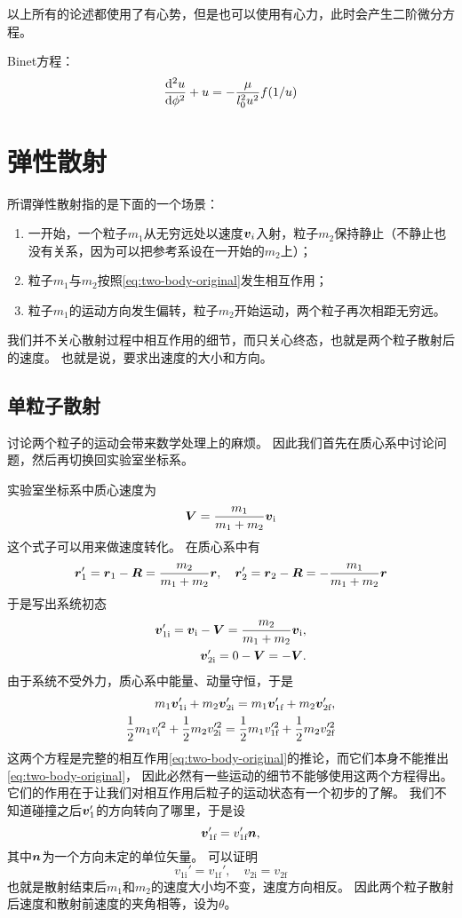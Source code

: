 \documentclass[UTF8, a4paper]{ctexart}
\begin{document}
以上所有的论述都使用了有心势，但是也可以使用有心力，此时会产生二阶微分方程。

Binet方程：
\begin{equation}
    \dv[2]{u}{\phi} + u = - \frac{\mu}{l_0^2 u^2} f(1/u)
\end{equation}

\section{弹性散射}

所谓弹性散射指的是下面的一个场景：
\begin{enumerate}
    \item 一开始，一个粒子$m_1$从无穷远处以速度$\vb*{v}_i$入射，粒子$m_2$保持静止（不静止也没有关系，因为可以把参考系设在一开始的$m_2$上）；
    \item 粒子$m_1$与$m_2$按照\eqref{eq:two-body-original}发生相互作用；
    \item 粒子$m_1$的运动方向发生偏转，粒子$m_2$开始运动，两个粒子再次相距无穷远。
\end{enumerate}
我们并不关心散射过程中相互作用的细节，而只关心终态，也就是两个粒子散射后的速度。
也就是说，要求出速度的大小和方向。

\subsection{单粒子散射}

讨论两个粒子的运动会带来数学处理上的麻烦。
因此我们首先在质心系中讨论问题，然后再切换回实验室坐标系。

实验室坐标系中质心速度为
\[
    \vb*{V} = \frac{m_1}{m_1 + m_2} \vb*{v}_\text{i}
\]
这个式子可以用来做速度转化。
在质心系中有
\[
    \vb*{r}_1' = \vb*{r}_1 - \vb*{R} = \frac{m_2}{m_1 + m_2} \vb*{r}, 
    \quad \vb*{r}_2' = \vb*{r}_2 - \vb*{R} = - \frac{m_1}{m_1 + m_2} \vb*{r}
\]
于是写出系统初态
\[
    \begin{split}
        \vb*{v}_{1\text{i}}' = \vb*{v}_\text{i} - \vb*{V} = \frac{m_2}{m_1 + m_2} \vb*{v}_\text{i}, \\
        \vb*{v}_{2\text{i}}' = 0 - \vb*{V} = - \vb*{V}.
    \end{split}
\]
由于系统不受外力，质心系中能量、动量守恒，于是
\[
    \begin{split}
        m_1 \vb*{v}'_{1\text{i}} + m_2 \vb*{v}'_{2\text{i}} = m_1 \vb*{v}'_{1\text{f}} + m_2 \vb*{v}'_{2\text{f}}, \\
        \frac{1}{2} m_1 v_\text{i}'^2 + \frac{1}{2} m_2 v_{2\text{i}}'^2 = \frac{1}{2} m_1 v_{1\text{f}}'^2 + \frac{1}{2} m_2 v_{2\text{f}}'^2
    \end{split}
\]
这两个方程是完整的相互作用\eqref{eq:two-body-original}的推论，而它们本身不能推出\eqref{eq:two-body-original}，
因此必然有一些运动的细节不能够使用这两个方程得出。
它们的作用在于让我们对相互作用后粒子的运动状态有一个初步的了解。
我们不知道碰撞之后$\vb*{v}_1'$的方向转向了哪里，于是设
\[
    \vb*{v}_{1\text{f}}' = v_{1\text{f}}' \vb*{n},
\]
其中$\vb*{n}$为一个方向未定的单位矢量。
可以证明
\[
    v_{1\text{i}}' = v_{1\text{f}}', \quad v_{2\text{i}} = v_{2\text{f}}
\]
也就是散射结束后$m_1$和$m_2$的速度大小均不变，速度方向相反。
因此两个粒子散射后速度和散射前速度的夹角相等，设为$\theta$。
\end{document}
